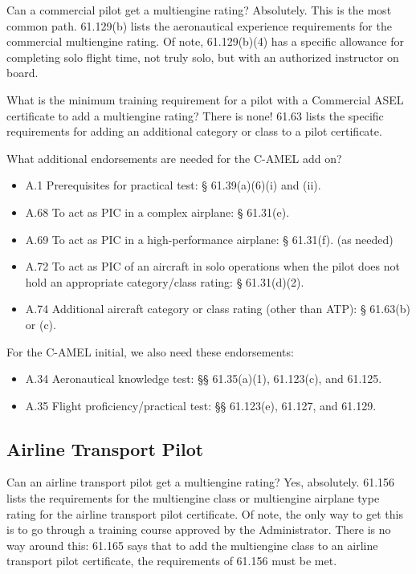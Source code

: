Can a commercial pilot get a multiengine rating? Absolutely. This is the most common path.
61.129(b) lists the aeronautical experience requirements for the commercial multiengine rating.
Of note, 61.129(b)(4) has a specific allowance for completing solo flight time, not truly solo, but
with an authorized instructor on board.

What is the minimum training requirement for a pilot with a Commercial ASEL certificate
to add a multiengine rating? There is none! 61.63 lists the specific requirements for adding an
additional category or class to a pilot certificate.

What additional endorsements are needed for the C-AMEL add on?

\begin{itemize}
\item A.1 Prerequisites for practical test: § 61.39(a)(6)(i) and (ii).
\item A.68 To act as PIC in a complex airplane: § 61.31(e).
\item A.69 To act as PIC in a high-performance airplane: § 61.31(f). (as needed)
\item A.72 To act as PIC of an aircraft in solo operations when the pilot does not hold an
appropriate category/class rating: § 61.31(d)(2).
\item A.74 Additional aircraft category or class rating (other than ATP): § 61.63(b) or (c).
\end{itemize}

For the C-AMEL initial, we also need these endorsements:

\begin{itemize}
\item A.34 Aeronautical knowledge test: §§ 61.35(a)(1), 61.123(c), and 61.125.
\item A.35 Flight proficiency/practical test: §§ 61.123(e), 61.127, and 61.129.
\end{itemize}

\subsection{Airline Transport Pilot}

Can an airline transport pilot get a multiengine rating? Yes, absolutely. 61.156 lists the requirements
for the multiengine class or multiengine airplane type rating for the airline transport pilot certificate.
Of note, the only way to get this is to go through a training course approved by the Administrator. There is
no way around this: 61.165 says that to add the multiengine class to an airline transport pilot certificate,
the requirements of 61.156 must be met.

